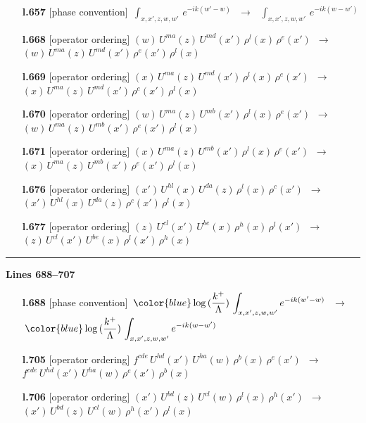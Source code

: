 \documentclass[10pt]{article}
\begin{document}
\begin{itemize}[leftmargin=2.2em,itemsep=1pt,topsep=2pt]
\item[\textbf{l.657}] \textsf{\small [phase convention]} $\displaystyle \,\int_{x,x',z,w,w'}\,e^{-ik(w'-w)}\,$\ $\longrightarrow$\ $\displaystyle \,\int_{x,x',z,w,w'}\,e^{-ik(w-w')}\,$
\item[\textbf{l.668}] \textsf{\small [operator ordering]} $\displaystyle (w)\,U^{ma}(z)\,U^{md}(x')\,\rho^{l}(x)\,\rho^{e}(x')$\ $\longrightarrow$\ $\displaystyle (w)\,U^{ma}(z)\,U^{md}(x')\,\rho^{e}(x')\,\rho^{l}(x)$
\item[\textbf{l.669}] \textsf{\small [operator ordering]} $\displaystyle (x)\,U^{ma}(z)\,U^{md}(x')\,\rho^{l}(x)\,\rho^{e}(x')$\ $\longrightarrow$\ $\displaystyle (x)\,U^{ma}(z)\,U^{md}(x')\,\rho^{e}(x')\,\rho^{l}(x)$
\item[\textbf{l.670}] \textsf{\small [operator ordering]} $\displaystyle (w)\,U^{ma}(z)\,U^{mb}(x')\,\rho^{l}(x)\,\rho^{e}(x')$\ $\longrightarrow$\ $\displaystyle (w)\,U^{ma}(z)\,U^{mb}(x')\,\rho^{e}(x')\,\rho^{l}(x)$
\item[\textbf{l.671}] \textsf{\small [operator ordering]} $\displaystyle (x)\,U^{ma}(z)\,U^{mb}(x')\,\rho^{l}(x)\,\rho^{e}(x')$\ $\longrightarrow$\ $\displaystyle (x)\,U^{ma}(z)\,U^{mb}(x')\,\rho^{e}(x')\,\rho^{l}(x)$
\item[\textbf{l.676}] \textsf{\small [operator ordering]} $\displaystyle (x')\,U^{hl}(x)\,U^{da}(z)\,\rho^{l}(x)\,\rho^{c}(x')$\ $\longrightarrow$\ $\displaystyle (x')\,U^{hl}(x)\,U^{da}(z)\,\rho^{c}(x')\,\rho^{l}(x)$
\item[\textbf{l.677}] \textsf{\small [operator ordering]} $\displaystyle (z)\,U^{cl}(x')\,U^{be}(x)\,\rho^{h}(x)\,\rho^{l}(x')$\ $\longrightarrow$\ $\displaystyle (z)\,U^{cl}(x')\,U^{be}(x)\,\rho^{l}(x')\,\rho^{h}(x)$
\end{itemize}
\noindent\rule{\linewidth}{0.3pt}\par\noindent\textbf{Lines 688--707} \par
\begin{itemize}[leftmargin=2.2em,itemsep=1pt,topsep=2pt]
\item[\textbf{l.688}] \textsf{\small [phase convention]} $\displaystyle \,{\color{blue}\log{(\frac{k^{+}}{\Lambda})}}\,\int_{x,x',z,w,w'}e^{-ik(w'-w)}\,$\ $\longrightarrow$\ $\displaystyle \,{\color{blue}\log{(\frac{k^{+}}{\Lambda})}}\,\int_{x,x',z,w,w'}e^{-ik(w-w')}\,$
\item[\textbf{l.705}] \textsf{\small [operator ordering]} $\displaystyle f^{cde}\,U^{hd}(x')\,U^{ha}(w)\,\rho^{b}(x)\,\rho^{e}(x')$\ $\longrightarrow$\ $\displaystyle f^{cde}\,U^{hd}(x')\,U^{ha}(w)\,\rho^{e}(x')\,\rho^{b}(x)$
\item[\textbf{l.706}] \textsf{\small [operator ordering]} $\displaystyle (x')\,U^{bd}(z)\,U^{cl}(w)\,\rho^{l}(x)\,\rho^{h}(x')$\ $\longrightarrow$\ $\displaystyle (x')\,U^{bd}(z)\,U^{cl}(w)\,\rho^{h}(x')\,\rho^{l}(x)$
\end{itemize}
\end{document}
